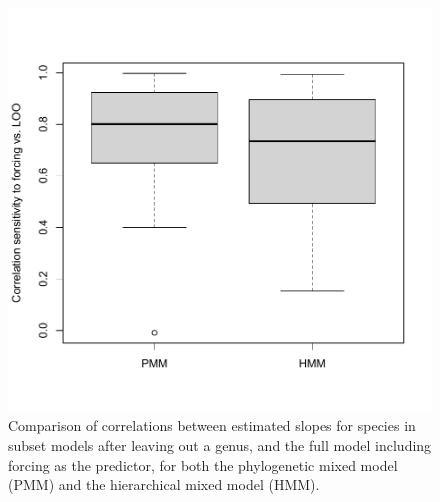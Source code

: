 \documentclass[11pt]{article}
\begin{document}
\begin{figure}
  \begin{center}
  \includegraphics[width=14cm]{../../analyses/phylogeny/figures/FigSXXX_LOO_cors_sensitivity_forcing.pdf}
  \caption{Comparison of correlations between estimated slopes for species in subset models after leaving out a genus, and the full model including forcing as the predictor, for both the phylogenetic mixed model (PMM) and the hierarchical mixed model (HMM).}
  \label{fig:LOCO_slopescors}
  \end{center}
\end{figure}

\clearpage
\end{document}
